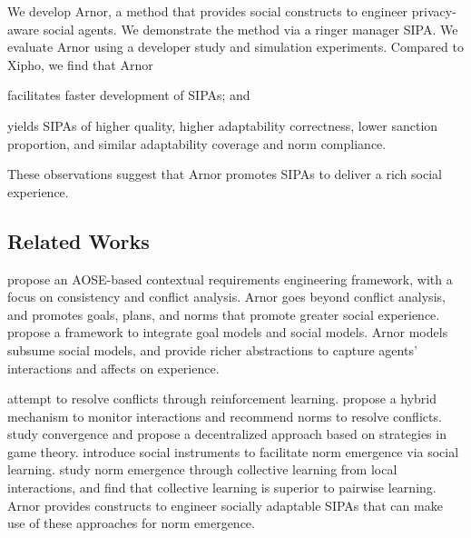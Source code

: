 \documentclass[11pt,          %
               phd,           %
               onehalfspacing %
               ]{ncsuthesis}
\newcommand{\frameworkA}{Arnor\xspace}
\begin{document}
We develop \frameworkA, a method that provides social constructs to
engineer privacy-aware social agents. We demonstrate the method via a
ringer manager SIPA. We evaluate \frameworkA using a developer study and
simulation experiments. Compared to Xipho, we find that \frameworkA
\begin{enumerate*}[label=(\arabic*)]
\item facilitates faster development of SIPAs; and
\item yields SIPAs of higher quality, higher adaptability correctness, 
lower sanction proportion, and similar adaptability coverage and norm compliance.
\end{enumerate*}
These observations suggest that \frameworkA promotes SIPAs to deliver a rich 
social experience.

\subsection{Related Works}

\citet{Ali-2013-Reasoning} propose an AOSE-based contextual 
requirements engineering framework, with a focus on consistency and
conflict analysis.  \frameworkA goes beyond conflict analysis, and 
promotes goals, plans, and norms that promote greater social experience. 
\citet{Rahwan-2006-Integrating} propose a framework
to integrate goal models and social models. \frameworkA models subsume
social models, and provide richer abstractions to capture agents'
interactions and affects on experience. 

\citet{Sugawara-IJCAI11-Emergence} attempt to resolve
conflicts through reinforcement learning. \citet{Mashayekhi-IJCAI16-Silk} propose a hybrid mechanism to monitor
interactions and recommend norms to resolve conflicts. 
\citet{Mihaylov-2014-Decentralized} study convergence and propose a
decentralized approach based on strategies in game theory. 
\citet{Villatoro-TAAS13-Robust} introduce social instruments to
facilitate norm emergence via social learning. 
\citet{Yu-AAMAS13-Emergence} study norm emergence through collective
learning from local interactions, and find that collective learning is
superior to pairwise learning. \frameworkA provides constructs to
engineer socially adaptable SIPAs that can make use of these approaches
for norm emergence.
\end{document}
